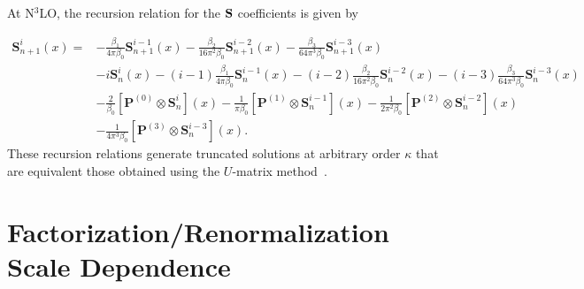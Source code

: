 \documentclass[12pt,notitlepage,aps,preprintnumbers,superscriptaddress,nofootinbib,aps,prd,floatfix]{revtex4-2}
\newcommand{\vv}[1]{\bm{\mathbf{#1}}}
\begin{document}
At N$^3$LO, the recursion relation for the ${\bf S}$ coefficients is given by

\begin{align}
  \vv{S}_{n+1}^i(x) = &-\frac{\beta_1}{4\pi\beta_0}\vv{S}_{n+1}^{i-1}(x)
-\frac{\beta_2}{16\pi^2\beta_0}\vv{S}_{n+1} ^{i-2}(x)
-\frac{\beta_3}{64\pi^3\beta_0}\vv{S}^{i-3}_{n+1}(x) \nonumber\\
&-i\vv{S}_n^i(x)-(i-1)\frac{\beta_1}{4\pi\beta_0}\vv{S}_n^{i-1}(x)
-(i-2)\frac{\beta_2}{16\pi^2\beta_0}\vv{S}_n^{i-2}(x) 
-(i-3)\frac{\beta_3}{64\pi^3\beta_0}\vv{S}_n^{i-3}(x) \nonumber\\
&-\frac{2}{\beta_0}[\vv{P}^{(0)}\otimes\vv{S}_n^i](x)
-\frac{1}{\pi\beta_0}[\vv{P}^{(1)}\otimes\vv{S}_n^{i-1}](x)
-\frac{1}{2\pi^2\beta_0}[\vv{P}^{(2)}\otimes\vv{S}_n^{i-2}](x) \nonumber\\
&-\frac{1}{4\pi^3\beta_0}[\vv{P}^{(3)}\otimes\vv{S}_n^{i-3}](x).
\label{eq:singlet-n3lo}
\end{align}
%
These recursion relations generate truncated solutions at arbitrary order $\kappa$ that are equivalent those obtained using the $U$-matrix method~\cite{Blumlein:1997em,Vogt:2004ns,Cafarella:2005zj}.  


\section{Factorization/Renormalization Scale Dependence}
\label{scale-dep}
\end{document}
